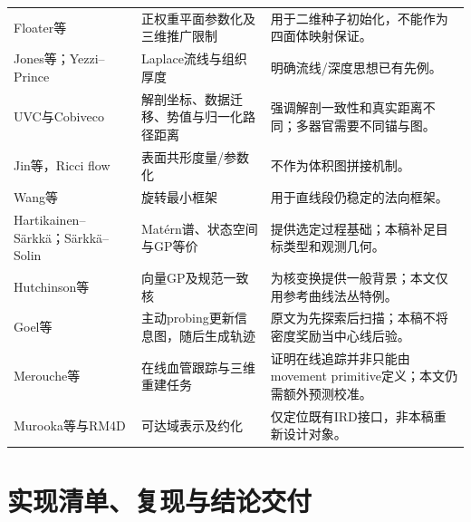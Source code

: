 \documentclass[UTF8,11pt,a4paper,fontset=fandol]{ctexart}
\numberwithin{equation}{section}
\theoremstyle{plain}
\theoremstyle{definition}
\theoremstyle{remark}
\begin{document}
\begin{longtable}{P{32mm}P{65mm}P{49mm}}
Floater等\cite{Floater2003,Floater2006} & 正权重平面参数化及三维推广限制 & 用于二维种子初始化，不能作为四面体映射保证。\\
Jones等；Yezzi--Prince\cite{Jones2000,Yezzi2003} & Laplace流线与组织厚度 & 明确流线/深度思想已有先例。\\
UVC与Cobiveco\cite{Bayer2018,Schuler2021} & 解剖坐标、数据迁移、势值与归一化路径距离 & 强调解剖一致性和真实距离不同；多器官需要不同锚与图。\\
Jin等，Ricci flow\cite{Jin2008} & 表面共形度量/参数化 & 不作为体积图拼接机制。\\
Wang等\cite{Wang2008} & 旋转最小框架 & 用于直线段仍稳定的法向框架。\\
Hartikainen--S\"arkk\"a；S\"arkk\"a--Solin\cite{Hartikainen2010,SarkkaSolin2019} & Mat\'ern谱、状态空间与GP等价 & 提供选定过程基础；本稿补足目标类型和观测几何。\\
Hutchinson等\cite{Hutchinson2021} & 向量GP及规范一致核 & 为核变换提供一般背景；本文仅用参考曲线法丛特例。\\
Goel等\cite{Goel2022} & 主动probing更新信息图，随后生成轨迹 & 原文为先探索后扫描；本稿不将密度奖励当中心线后验。\\
Merouche等\cite{Merouche2016} & 在线血管跟踪与三维重建任务 & 证明在线追踪并非只能由movement primitive定义；本文仍需额外预测校准。\\
Murooka等与RM4D\cite{Murooka2025,RudorferRM4D} & 可达域表示及约化 & 仅定位既有IRD接口，非本稿重新设计对象。\\
\end{longtable}
\normalsize

\section{实现清单、复现与结论交付}\label{app:implementation}
\end{document}
